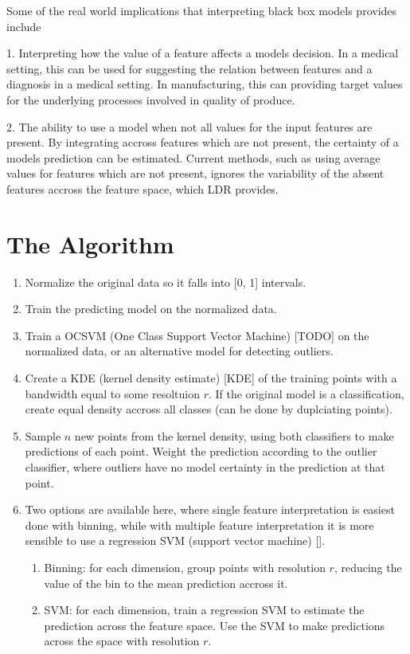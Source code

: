 \documentclass[a4paperpaper,twocolumn]{article}
\begin{document}
Some of the real world implications that interpreting black box models provides include

1. Interpreting how the value of a feature affects a models decision. In a medical setting, this can be used for suggesting the relation between features and a diagnosis in a medical setting. In manufacturing, this can providing target values for the underlying processes involved in quality of produce. 

2. The ability to use a model when not all values for the input features are present. By integrating accross features which are not present, the certainty of a models prediction can be estimated. Current methods, such as using average values for features which are not present, ignores the variability of the absent features accross the feature space, which LDR provides.

\section{The Algorithm}

\begin{enumerate}
\item Normalize the original data so it falls into [0, 1] intervals.
\item Train the predicting model on the normalized data.
\item Train a OCSVM (One Class Support Vector Machine) [TODO] on the normalized data, or an alternative model for detecting outliers.
\item Create a KDE (kernel density estimate) [KDE] of the training points with a bandwidth equal to some resoltuion $r$. If the original model is a classification, create equal density accross all classes (can be done by duplciating points).
\item Sample $n$ new points from the kernel density, using both classifiers to make predictions of each point. Weight the prediction according to the outlier classifier, where outliers have no model certainty in the prediction at that point.
\item Two options are available here, where single feature interpretation is easiest done with binning, while with multiple feature interpretation it is more sensible to use a regression SVM (support vector machine) [].
    \begin{enumerate}
        \item Binning: for each dimension, group points with resolution $r$, reducing the value of the bin to the mean prediction accross it.
        \item SVM: for each dimension, train a regression SVM to estimate the prediction across the feature space. Use the SVM to make predictions across the space with resolution $r$.
    \end{enumerate}
\end{enumerate}
\end{document}
